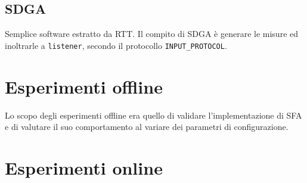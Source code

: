 \subsection{SDGA}
Semplice software estratto da RTT. Il compito di SDGA \`e generare le misure ed inoltrarle a \texttt{listener}, secondo il protocollo \texttt{INPUT\_PROTOCOL}.
\section{Esperimenti offline}
Lo scopo degli esperimenti offline era quello di validare l'implementazione di SFA e di valutare il suo comportamento al variare dei parametri di configurazione.
\section{Esperimenti online}